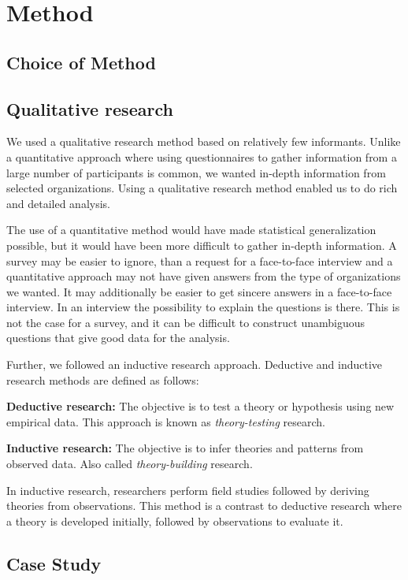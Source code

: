 \chapter{Method}
\section{Choice of Method}


\section{Qualitative research}
\label{sec:qualitativeresearch}
We used a qualitative research method based on relatively few informants. Unlike a quantitative approach where using questionnaires to gather information from a large number of participants is common, we wanted in-depth information from selected organizations. Using a qualitative research method enabled us to do rich and detailed analysis. 

The use of a quantitative method would have made statistical generalization possible, but it would have been more difficult to gather in-depth information. A survey may be easier to ignore, than a request for a face-to-face interview and a quantitative approach may not have given answers from the type of organizations we wanted. It may additionally be easier to get sincere answers in a face-to-face interview. In an interview the possibility to explain the questions is there. This is not the case for a survey, and it can be difficult to construct unambiguous questions that give good data for the analysis.

Further, we followed an inductive research approach. Deductive and inductive research methods are defined as follows\cite{bhattacherjee2012social}: 

\textbf{Deductive research:} The objective is to test a theory or hypothesis using new empirical data. This approach is known as \emph{theory-testing} research.

\textbf{Inductive research:} The objective is to infer theories and patterns from observed data. Also called \emph{theory-building} research.

In inductive research, researchers perform field studies followed by deriving theories from observations. This method is a contrast to deductive research where a theory is developed initially, followed by observations to evaluate it\cite{oates2005researching}.

\section{Case Study}
\label{sec:caseStudy}


